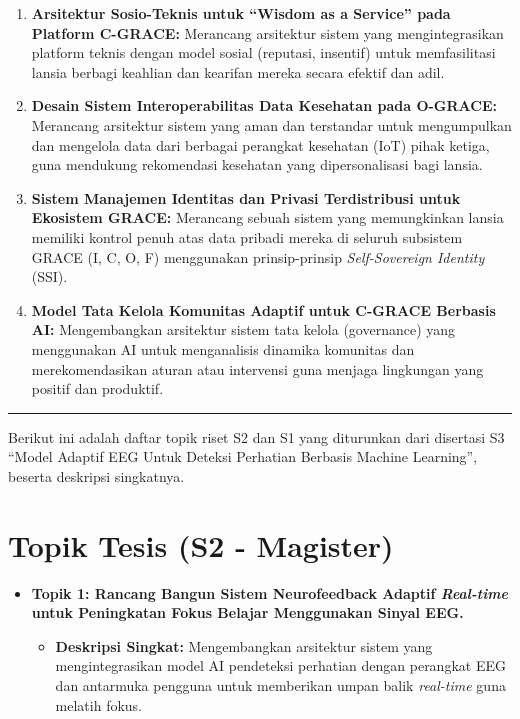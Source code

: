 \documentclass[
  letterpaper,
  DIV=11,
  numbers=noendperiod]{scrreprt}
\providecommand{\tightlist}{%
  \setlength{\itemsep}{0pt}\setlength{\parskip}{0pt}}
\begin{document}
\begin{enumerate}
\def\labelenumi{\arabic{enumi}.}
\item
  \textbf{Arsitektur Sosio-Teknis untuk ``Wisdom as a Service'' pada
  Platform C-GRACE:} Merancang arsitektur sistem yang mengintegrasikan
  platform teknis dengan model sosial (reputasi, insentif) untuk
  memfasilitasi lansia berbagi keahlian dan kearifan mereka secara
  efektif dan adil.
\item
  \textbf{Desain Sistem Interoperabilitas Data Kesehatan pada O-GRACE:}
  Merancang arsitektur sistem yang aman dan terstandar untuk
  mengumpulkan dan mengelola data dari berbagai perangkat kesehatan
  (IoT) pihak ketiga, guna mendukung rekomendasi kesehatan yang
  dipersonalisasi bagi lansia.
\item
  \textbf{Sistem Manajemen Identitas dan Privasi Terdistribusi untuk
  Ekosistem GRACE:} Merancang sebuah sistem yang memungkinkan lansia
  memiliki kontrol penuh atas data pribadi mereka di seluruh subsistem
  GRACE (I, C, O, F) menggunakan prinsip-prinsip \emph{Self-Sovereign
  Identity} (SSI).
\item
  \textbf{Model Tata Kelola Komunitas Adaptif untuk C-GRACE Berbasis
  AI:} Mengembangkan arsitektur sistem tata kelola (governance) yang
  menggunakan AI untuk menganalisis dinamika komunitas dan
  merekomendasikan aturan atau intervensi guna menjaga lingkungan yang
  positif dan produktif.
\end{enumerate}

\begin{center}\rule{0.5\linewidth}{0.5pt}\end{center}

Berikut ini adalah daftar topik riset S2 dan S1 yang diturunkan dari
disertasi S3 ``Model Adaptif EEG Untuk Deteksi Perhatian Berbasis
Machine Learning'', beserta deskripsi singkatnya.

\section{\texorpdfstring{\textbf{Topik Tesis (S2 -
Magister)}}{Topik Tesis (S2 - Magister)}}\label{topik-tesis-s2---magister}

\begin{itemize}
\tightlist
\item
  \textbf{Topik 1: Rancang Bangun Sistem Neurofeedback Adaptif
  \emph{Real-time} untuk Peningkatan Fokus Belajar Menggunakan Sinyal
  EEG.}

  \begin{itemize}
  \tightlist
  \item
    \textbf{Deskripsi Singkat:} Mengembangkan arsitektur sistem yang
    mengintegrasikan model AI pendeteksi perhatian dengan perangkat EEG
    dan antarmuka pengguna untuk memberikan umpan balik \emph{real-time}
    guna melatih fokus.
  \end{itemize}
\end{itemize}
\end{document}
